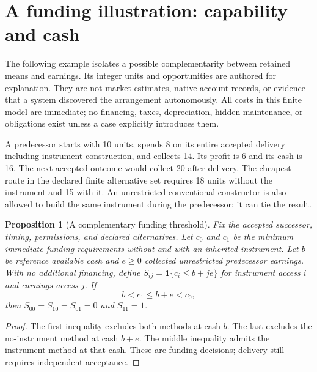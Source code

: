 \documentclass[10pt,a4paper]{article}
\newtheorem{proposition}{Proposition}
\begin{document}
\section{A funding illustration: capability and cash}\label{sec:example}

The following example isolates a possible complementarity between retained means and earnings. Its integer units and opportunities are authored for explanation. They are not market estimates, native account records, or evidence that a system discovered the arrangement autonomously. All costs in this finite model are immediate; no financing, taxes, depreciation, hidden maintenance, or obligations exist unless a case explicitly introduces them.

A predecessor starts with 10 units, spends 8 on its entire accepted delivery including instrument construction, and collects 14. Its profit is 6 and its cash is 16. The next accepted outcome would collect 20 after delivery. The cheapest route in the declared finite alternative set requires 18 units without the instrument and 15 with it. An unrestricted conventional constructor is also allowed to build the same instrument during the predecessor; it can tie the result.

\begin{samepage}
\begin{proposition}[A complementary funding threshold]\label{prop:threshold}
Fix the accepted successor, timing, permissions, and declared alternatives. Let $c_0$ and $c_1$ be the minimum immediate funding requirements without and with an inherited instrument. Let $b$ be reference available cash and $e\geq0$ collected unrestricted predecessor earnings. With no additional financing, define $S_{ij}=\mathbf1\{c_i\leq b+je\}$ for instrument access $i$ and earnings access $j$. If
\begin{equation}
 b<c_1\leq b+e<c_0,
\label{eq:threshold}
\end{equation}
then $S_{00}=S_{10}=S_{01}=0$ and $S_{11}=1$.
\end{proposition}
\begin{proof}
The first inequality excludes both methods at cash $b$. The last excludes the no-instrument method at cash $b+e$. The middle inequality admits the instrument method at that cash. These are funding decisions; delivery still requires independent acceptance.
\end{proof}
\end{samepage}
\end{document}
